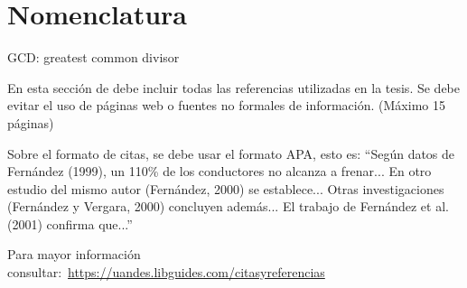 \documentclass[12pt]{report}
\begin{document}
\label{start}








\cleardoublepage

\chapter*{Nomenclatura}


GCD: greatest common divisor


\cleardoublepage

{\color{blue} En esta sección de debe incluir todas las referencias utilizadas en la tesis. Se debe evitar el uso de páginas web o fuentes no formales de información. (Máximo 15 páginas)

\vspace{0.5cm}

Sobre el formato de citas, se debe usar el formato APA, esto es: ``Según datos de Fernández (1999), un 110\% de los conductores no alcanza a frenar... En otro estudio del mismo autor (Fernández, 2000) se establece... Otras investigaciones (Fernández y Vergara, 2000) concluyen además... El trabajo de Fernández et al. (2001) confirma que...''

\vspace{0.5cm}

Para mayor información consultar: \url{https://uandes.libguides.com/citasyreferencias} 
}



\appendix %

\cleardoublepage





\label{end}
\end{document}
